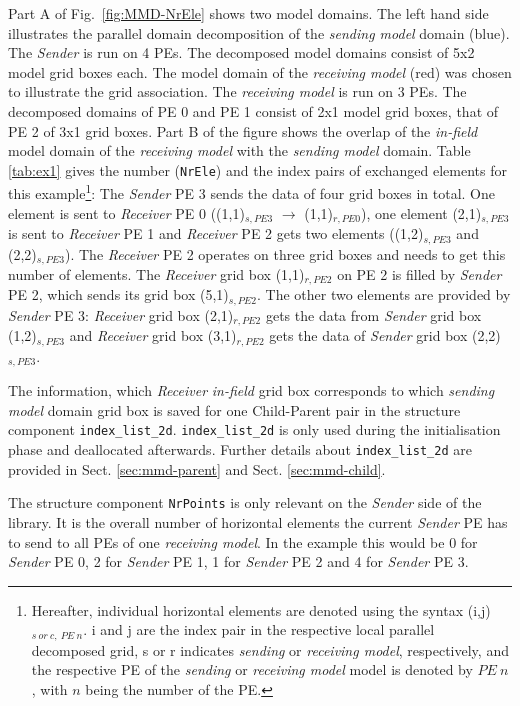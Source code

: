 \documentclass[twoside]{article}
\begin{document}
Part A of Fig.\ \ref{fig:MMD-NrEle} shows two model domains. The left hand side
 illustrates the parallel domain decomposition of the {\it sending model} domain
 (blue). The {\it Sender} is run on  4 PEs. The decomposed model domains
 consist of 5x2 model grid boxes each. The model
 domain of the {\it receiving model} (red) was chosen to illustrate
 the grid association. The {\it receiving model}  is run on 3 PEs. The
 decomposed domains of PE 0 and PE 1 consist  
of 2x1 model grid boxes, that of PE 2 of 3x1 grid boxes. Part B of the figure 
shows the overlap of the {\it in-field} model domain of the {\it
 receiving model} with the {\it sending model}  domain. 
Table \ref{tab:ex1} gives the number (\verb|NrEle|) and the index pairs
 of exchanged elements for this example\footnote{Hereafter, individual 
horizontal elements are denoted using the syntax
 (i,j)$_{s~or~c,~PE~n}$. i and j are the index
 pair in the respective local parallel decomposed grid, s or r
 indicates {\it sending} or {\it receiving model}, respectively, and
 the respective PE of the {\it sending} or {\it receiving model} 
model is denoted by $PE~n$, with $n$ being the number of the PE.}:
 The {\it Sender} PE 3 sends the data of four grid boxes in total. One element is sent
 to {\it Receiver} PE 0 ((1,1)$_{s,PE3}$ $\rightarrow$
 (1,1)$_{r,PE0}$), one element (2,1)$_{s,PE3}$ is sent to {\it Receiver} PE
 1 and {\it Receiver} PE 2 gets two elements ((1,2)$_{s,PE3}$  and
 (2,2)$_{s,PE3}$). The {\it Receiver} PE 2  operates on three grid boxes and
 needs to get this number of elements. The {\it Receiver}
grid box (1,1)$_{r,PE2}$ on PE 2 is filled by {\it Sender} PE 2, which sends
 its grid box 
 (5,1)$_{s,PE2}$. The other two elements are provided by {\it Sender} PE 3:
 {\it Receiver} grid box
 (2,1)$_{r,PE2}$ gets the data from {\it Sender} grid box (1,2)$_{s,PE3}$
 and {\it Receiver} grid box (3,1)$_{r,PE2}$ gets the data of {\it Sender} grid
 box (2,2)$_{s,PE3}$. 

The information, which {\it Receiver} {\it in-field} grid box
corresponds to which {\it sending model} domain grid box is saved for
one Child-Parent pair in the structure 
 component \verb|index_list_2d|. \verb|index_list_2d| is only used
 during the  
initialisation phase and deallocated afterwards. Further details about 
\verb|index_list_2d| are provided in Sect. \ref{sec:mmd-parent} and Sect. \ref{sec:mmd-child}.


The structure component \verb|NrPoints| is only relevant on the {\it
 Sender} side of the library. 
It is the overall number of horizontal elements the current 
{\it Sender} PE has to send to all PEs of one {\it receiving model}.
 In the example this would be 0 for {\it Sender} PE 0, 2 for {\it
 Sender} PE 1, 1 for {\it Sender} PE 2 and 4 for {\it Sender} PE 3. 
\end{document}
